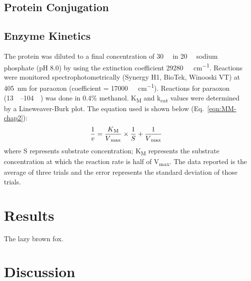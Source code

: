 \begin{refsection}
\subsection{Protein Conjugation}


\subsection{Enzyme Kinetics}

The protein was diluted to a final concentration of \SI{30}{\nano\Molar} in
\SI{20}{\milli\Molar} sodium phosphate (pH 8.0) by using the extinction
coefficient \SI{29280}{\per\Molar\per\cm}. Reactions were monitored
spectrophotometrically (Synergy H1, BioTek, Winooski VT) at \SI{405}{\nm} for
paraoxon (coefficient = \SI{17000}{\per\Molar\per\cm}).  Reactions for paraoxon
(\SIrange{13}{104}{\micro\Molar}) was done in 0.4\% methanol.
K\textsubscript{M} and k\textsubscript{cat} values were determined by a
Lineweaver-Burk plot.\cite{Baker2011b} The equation used is shown below
(Eq.~\ref{eqn:MM-chap2}): 
\begin{equation} 
    \frac{1}{v} =
    \frac{K\textsubscript{M}}{V\textsubscript{max}}\times\frac{1}{S} +
    \frac{1}{V\textsubscript{max}} 
    \label{eqn:MM-chap3}
\end{equation}
where S represents substrate concentration; K\textsubscript{M} represents the
substrate concentration at which the reaction rate is half of
V\textsubscript{max}. The data reported is the average of three trials and the
error represents the standard deviation of those trials.

\section{Results}

The lazy brown fox.

\section{Discussion}


\printbibliography[heading=subbibliography]

\end{refsection}
